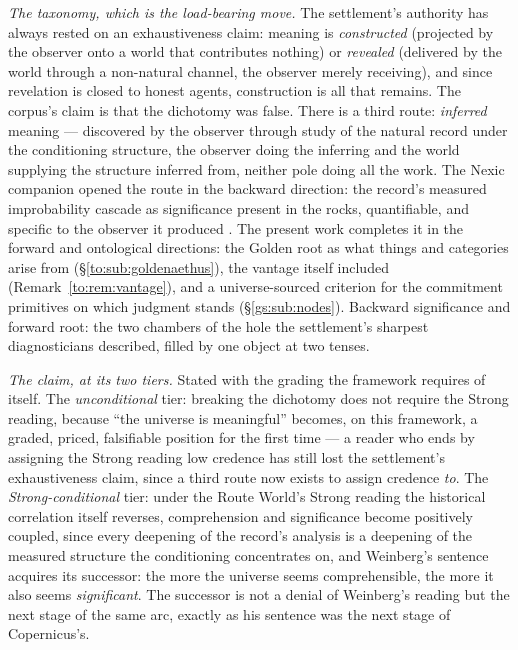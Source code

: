 \documentclass[11pt]{article}
\numberwithin{equation}{section}
\theoremstyle{plain}
\theoremstyle{definition}
\theoremstyle{remark}
\begin{document}
\emph{The taxonomy, which is the load-bearing move.} The settlement's
authority has always rested on an exhaustiveness claim: meaning is
\emph{constructed} (projected by the observer onto a world that
contributes nothing) or \emph{revealed} (delivered by the world
through a non-natural channel, the observer merely receiving), and
since revelation is closed to honest agents, construction is all that
remains. The corpus's claim is that the dichotomy was false. There is
a third route: \emph{inferred} meaning --- discovered by the observer
through study of the natural record under the conditioning structure,
the observer doing the inferring and the world supplying the
structure inferred from, neither pole doing all the work. The Nexic
companion opened the route in the backward direction: the record's
measured improbability cascade as significance present in the rocks,
quantifiable, and specific to the observer it produced \cite{Nexus}.
The present work completes it in the forward and ontological
directions: the Golden root as what things and categories arise from
(\S\ref{to:sub:goldenaethus}), the vantage itself included
(Remark~\ref{to:rem:vantage}), and a universe-sourced criterion for
the commitment primitives on which judgment stands
(\S\ref{gs:sub:nodes}). Backward significance and forward root: the
two chambers of the hole the settlement's sharpest diagnosticians
described, filled by one object at two tenses.

\emph{The claim, at its two tiers.} Stated with the grading the
framework requires of itself. The \emph{unconditional} tier: breaking
the dichotomy does not require the Strong reading, because ``the
universe is meaningful'' becomes, on this framework, a graded,
priced, falsifiable position for the first time --- a reader who ends
by assigning the Strong reading low credence has still lost the
settlement's exhaustiveness claim, since a third route now exists to
assign credence \emph{to}. The \emph{Strong-conditional} tier: under
the Route World's Strong reading the historical correlation itself
reverses, comprehension and significance become positively
coupled, since every deepening of the record's analysis is a
deepening of the measured structure the conditioning concentrates on, and Weinberg's sentence acquires its successor: the more the
universe seems comprehensible, the more it also seems
\emph{significant}. The successor is not a denial of Weinberg's
reading but the next stage of the same arc, exactly as his sentence
was the next stage of Copernicus's.
\end{document}

